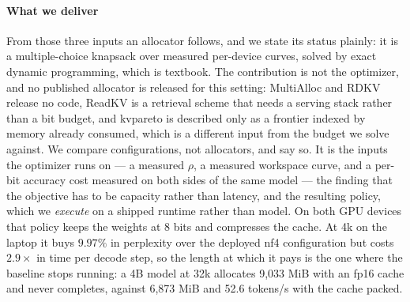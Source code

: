 \documentclass[10pt,journal]{IEEEtran}
\newcommand{\rhoSym}{\rho}
\begin{document}
\paragraph*{What we deliver}
From those three inputs an allocator follows, and we state its status plainly:
it is a multiple-choice knapsack over measured per-device curves, solved by exact
dynamic programming, which is textbook. The contribution is not the optimizer, and no published allocator is released
for this setting: MultiAlloc and RDKV release no code, ReadKV is a
retrieval scheme that needs a serving stack rather than a bit budget, and
kvpareto is described only as a frontier indexed by memory already consumed,
which is a different input from the budget we solve against. We compare
configurations, not allocators, and say so.
It is the inputs the optimizer runs on --- a measured $\rhoSym$, a measured
workspace curve, and a per-bit accuracy cost measured on both sides of the same
model --- the finding that the objective has to be capacity rather than latency,
and the resulting policy, which we \emph{execute} on a shipped runtime rather
than model. On both GPU devices that policy keeps the weights at 8 bits and
compresses the cache. At 4k on the laptop it buys $9.97\%$ in perplexity over
the deployed nf4 configuration but costs $2.9\times$ in time per decode step, so
the length at which it pays is the one where the baseline stops running: a 4B
model at 32k allocates 9,033 MiB with an fp16 cache and never completes,
against 6,873 MiB and 52.6 tokens/s with the cache packed.
\end{document}
